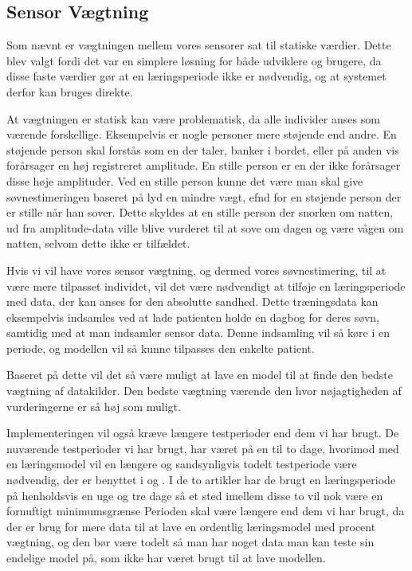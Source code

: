 \subsection{Sensor Vægtning}\label{subsec:sensorvaegtsoevn}
Som nævnt er vægtningen mellem vores sensorer sat til statiske værdier.
Dette blev valgt fordi det var en simplere løsning for både udviklere og brugere, da disse faste værdier gør at en læringsperiode ikke er nødvendig, og at systemet derfor kan bruges direkte.

At vægtningen er statisk kan være problematisk, da alle individer anses som værende forskellige. 
Eksempelvis er nogle personer mere støjende end andre.
En støjende person skal forstås som en der taler, banker i bordet, eller på anden vis forårsager en høj registreret amplitude.
En stille person er en der ikke forårsager disse høje amplituder.
Ved en stille person kunne det være man skal give søvnestimeringen baseret på lyd en mindre vægt, efnd for en støjende person der er stille når han sover.
Dette skyldes at en stille person der snorken om natten, ud fra amplitude-data ville blive vurderet til at sove om dagen og være vågen om natten, selvom dette ikke er tilfældet.

Hvis vi vil have vores sensor vægtning, og dermed vores søvnestimering, til at være mere tilpasset individet, vil det være nødvendigt at tilføje en læringsperiode med data, der kan anses for den absolutte sandhed.
Dette træningsdata kan eksempelvis indsamles ved at lade patienten holde en dagbog for deres søvn, samtidig med at man indsamler sensor data.
Denne indsamling vil så køre i en periode, og modellen vil så kunne tilpasses den enkelte patient.

Baseret på dette vil det så være muligt at lave en model til at finde den bedste vægtning af datakilder.
Den bedste vægtning værende den hvor nøjagtigheden af vurderingerne er så høj som muligt.

Implementeringen vil også kræve længere testperioder end dem vi har brugt.
De nuværende testperioder vi har brugt, har været på en til to dage, hvorimod med en læringsmodel vil en længere og sandsynligvis todelt testperiode være nødvendig, der er benyttet i \citet{6563918} og \citet{Min:2014:TNT:2556288.2557220}.
I de to artikler har de brugt en læringsperiode på henholdsvis en uge og tre dage så et sted imellem disse to vil nok være en fornuftigt minimumsgrænse
Perioden skal være længere end dem vi har brugt, da der er brug for mere data til at lave en ordentlig læringsmodel med procent vægtning, og den bør være todelt så man har noget data man kan teste sin endelige model på, som ikke har været brugt til at lave modellen.
